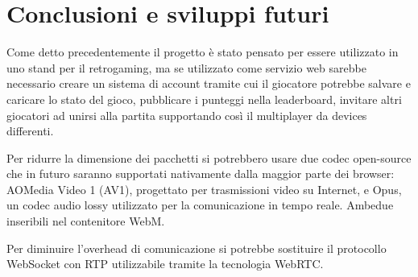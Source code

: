 %
%

\chapter{Conclusioni e sviluppi futuri}

Come detto precedentemente il progetto è stato pensato per essere utilizzato in uno stand per il retrogaming, ma se utilizzato come servizio web sarebbe necessario creare un sistema di account tramite cui il giocatore potrebbe salvare e caricare lo stato del gioco, pubblicare i punteggi nella leaderboard, invitare altri giocatori ad unirsi alla partita supportando così il multiplayer da devices differenti.

Per ridurre la dimensione dei pacchetti si potrebbero usare due codec open-source che in futuro saranno supportati nativamente dalla maggior parte dei browser: AOMedia Video 1 (AV1), progettato per trasmissioni video su Internet, e Opus, un codec audio lossy utilizzato per la comunicazione in tempo reale. Ambedue inseribili nel contenitore WebM.

Per diminuire l'overhead di comunicazione si potrebbe sostituire il protocollo WebSocket con RTP utilizzabile tramite la tecnologia WebRTC.